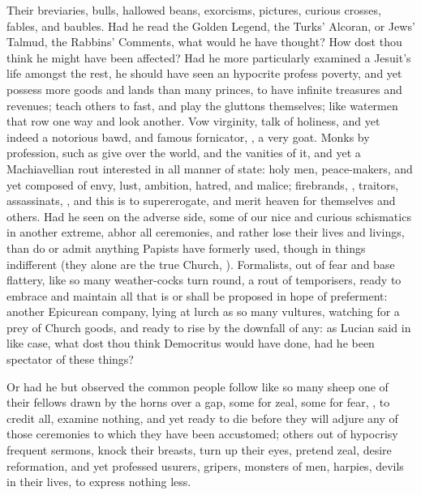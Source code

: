 Their breviaries, bulls, hallowed beans, exorcisms, pictures, curious crosses,
fables, and baubles. Had he read the Golden Legend, the Turks' Alcoran, or
Jews' Talmud, the Rabbins' Comments, what would he have thought? How dost thou
think he might have been affected? Had he more particularly examined a Jesuit's
life amongst the rest, he should have seen an hypocrite profess poverty,
and yet possess more goods and lands than many princes, to
have infinite treasures and revenues; teach others to fast, and play the
gluttons themselves; like watermen that row one way and look another.
Vow virginity, talk of holiness, and yet indeed a notorious
bawd, and famous fornicator, , a very goat. Monks by
profession, such as give over the world, and the vanities
of it, and yet a Machiavellian rout interested in all
manner of state: holy men, peace-makers, and yet composed of envy, lust,
ambition, hatred, and malice; firebrands, , traitors,
assassinats, , and this is to supererogate, and merit
heaven for themselves and others. Had he seen on the adverse side, some of our
nice and curious schismatics in another extreme, abhor all ceremonies, and
rather lose their lives and livings, than do or admit anything Papists have
formerly used, though in things indifferent (they alone are the true Church,
). Formalists, out of fear and
base flattery, like so many weather-cocks turn round, a rout of temporisers,
ready to embrace and maintain all that is or shall be proposed in hope of
preferment: another Epicurean company, lying at lurch as so many vultures,
watching for a prey of Church goods, and ready to rise by the downfall of any:
as Lucian said in like case, what dost thou think
Democritus would have done, had he been spectator of these things?

Or had he but observed the common people follow like so many sheep one of their
fellows drawn by the horns over a gap, some for zeal, some for fear, , to credit all, examine nothing, and yet ready to die
before they will adjure any of those ceremonies to which they have been
accustomed; others out of hypocrisy frequent sermons, knock their breasts, turn
up their eyes, pretend zeal, desire reformation, and yet professed usurers,
gripers, monsters of men, harpies, devils in their lives, to express nothing
less.

